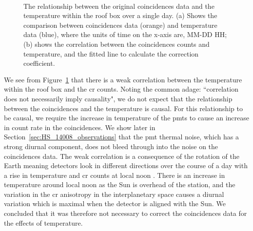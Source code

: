 \begin{figure}[ht!]
	\centering
	 \\
	
	\caption{The relationship between the original coincidences data and the temperature within the roof box over a single day. (a) Shows the comparison between coincidences data (orange) and temperature data (blue), where the units of time on the x-axis are, MM-DD HH; (b) shows the correlation between the coincidences counts and temperature, and the fitted line to calculate the correction coefficient.}
	\label{fig:14008_coincidences_v_T_corr}
\end{figure}

We see from Figure~\ref{fig:14008_coincidences_v_T_corr} that there is a weak correlation between the temperature within the roof box and the \gls{cr} counts. Noting the common adage: ``correlation does not necessarily imply causality", we do not expect that the relationship between the coincidences and the temperature is causal. For this relationship to be causal, we require the increase in temperature of the \glspl{pmt} to cause an increase in count rate in the coincidences. We show later in Section~\ref{sec:HS_14008_observations} that the \gls{pmt} thermal noise, which has a strong diurnal component, does not bleed through into the noise on the coincidences data. The weak correlation is a consequence of the rotation of the Earth meaning detectors look in
different directions over the course of a day with a rise in temperature and \gls{cr} counts at local noon \citep{parker_theory_1964, mishra_study_2007, mishra_cosmic_2008}. There is an increase in temperature around local noon as the Sun is overhead of the station, and the variation in the \gls{cr} anisotropy in the interplanetary space causes a diurnal variation which is maximal when the detector is aligned with the Sun. We concluded that it was therefore not necessary to correct the coincidences data for the effects of temperature.



